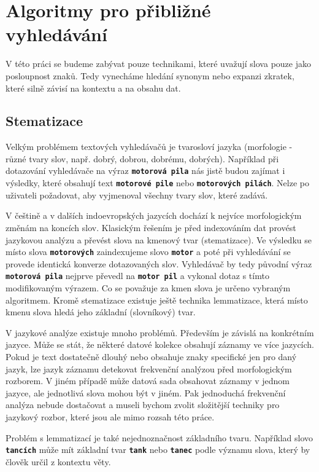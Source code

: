 \documentclass[11pt,letterpaper,oneside,openright]{book}
\newcommand{\bftt}[1]{\texttt{\textbf{#1}}}
\begin{document}
\section{Algoritmy pro přibližné vyhledávání}
V této práci se budeme zabývat pouze technikami, které uvažují slova pouze jako
posloupnost znaků. Tedy vynecháme hledání synonym nebo expanzi zkratek, které
silně závisí na kontextu a na obsahu dat.

\subsection{Stematizace}
Velkým problémem textových vyhledávačů je tvarosloví jazyka (morfologie - různé
tvary slov, např. dobrý, dobrou, dobrému, dobrých).  Například při dotazování
vyhledávače na výraz \bftt{motorová pila} nás jistě budou zajímat i výsledky,
které obsahují text \bftt{motorové pile} nebo \bftt{motorových pilách}. Nelze
po uživateli požadovat, aby vyjmenoval všechny tvary slov, které zadává.

V češtině a v dalších indoevropských jazycích dochází k nejvíce morfologickým
změnám na koncích slov. Klasickým řešením je před indexováním dat provést
jazykovou analýzu a převést slova na kmenový tvar (stematizace). Ve výsledku se
místo slova \bftt{motorových} zaindexujeme slovo \bftt{motor} a poté při
vyhledávání se provede identická konverze dotazovaných slov. Vyhledávač by tedy
původní výraz \bftt{motorová pila} nejprve převedl na \bftt{motor pil} a
vykonal dotaz s tímto modifikovaným výrazem. Co se považuje za kmen slova je
určeno vybraným algoritmem. Kromě stematizace existuje ještě technika
lemmatizace, která místo kmenu slova hledá jeho základní (slovníkový) tvar.

V jazykové analýze existuje mnoho problémů. Především je závislá na konkrétním
jazyce. Může se stát, že některé datové kolekce obsahují záznamy ve více
jazycích. Pokud je text dostatečně dlouhý nebo obsahuje znaky specifické jen
pro daný jazyk, lze jazyk záznamu detekovat frekvenční analýzou před
morfologickým rozborem. V jiném případě může datová sada obsahovat záznamy v
jednom jazyce, ale jednotlivá slova mohou být v jiném. Pak jednoduchá
frekvenční analýza nebude dostačovat a museli bychom zvolit složitější techniky
pro jazykový rozbor, které jsou ale mimo rozsah této práce.

Problém s lemmatizací je také nejednoznačnost základního tvaru. Například slovo
\bftt{tancích} může mít základní tvar \bftt{tank} nebo \bftt{tanec} podle
významu slova, který by člověk určil z kontextu věty.
\end{document}
